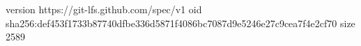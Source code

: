 version https://git-lfs.github.com/spec/v1
oid sha256:def453f1733b87740dfbe336d5871f4086bc7087d9e5246e27c9cea7f4e2cf70
size 2589
